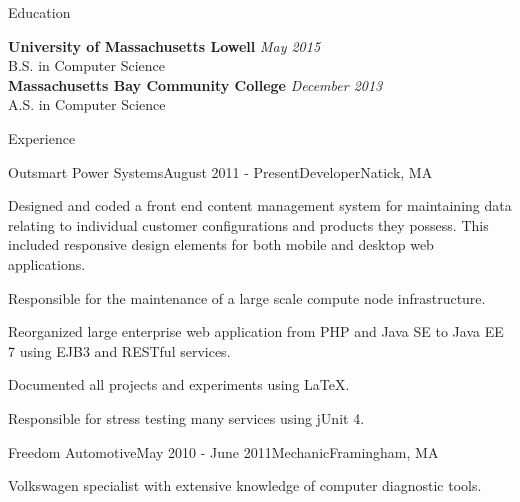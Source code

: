 \documentclass{resume} %
\begin{document}

\begin{rSection}{Education}

{\bf University of Massachusetts Lowell} \hfill {\em May 2015} \\ 
B.S. in Computer Science  \smallskip \\
{\bf Massachusetts Bay Community College} \hfill {\em December 2013} \\ 
A.S. in Computer Science  \smallskip \\

\end{rSection}


\begin{rSection}{Experience}


\begin{rSubsection}{Outsmart Power Systems}{August 2011 - Present}{Developer}{Natick, MA}
\item Designed and coded a front end content management system for maintaining data relating to individual customer configurations and products they possess. This included responsive design elements for both mobile and desktop web applications.
\item Responsible for the maintenance of a large scale compute node infrastructure.
\item Reorganized large enterprise web application from PHP and Java SE to Java EE 7 using EJB3 and RESTful services.
\item Documented all projects and experiments using \LaTeX.
\item Responsible for stress testing many services using jUnit 4.
\end{rSubsection}


\begin{rSubsection}{Freedom Automotive}{May 2010 - June 2011}{Mechanic}{Framingham, MA}
\item Volkswagen specialist with extensive knowledge of computer diagnostic tools.
\end{rSubsection}


\end{rSection}
\end{document}
